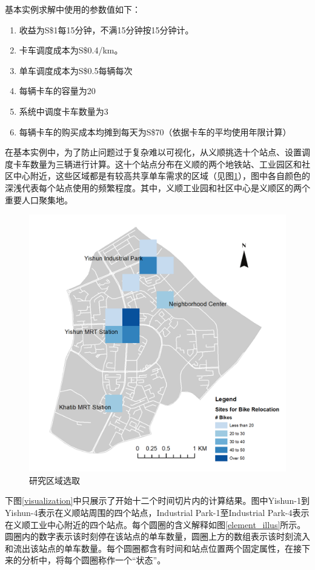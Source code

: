 \documentclass[]{tongjithesis}
\numberwithin{equation}{chapter}
\begin{document}
基本实例求解中使用的参数值如下：
\begin{enumerate}
	\item 收益为S\$1每15分钟，不满15分钟按15分钟计。
	\item 卡车调度成本为S\$0.4/km。
	\item 单车调度成本为S\$0.5每辆每次
	\item 每辆卡车的容量为20
	\item 系统中调度卡车数量为3
	\item 每辆卡车的购买成本均摊到每天为S\$70（依据卡车的平均使用年限计算）
\end{enumerate}

在基本实例中，为了防止问题过于复杂难以可视化，从义顺挑选十个站点、设置调度卡车数量为三辆进行计算。这十个站点分布在义顺的两个地铁站、工业园区和社区中心附近，这些区域都是有较高共享单车需求的区域（见图\ref{selected10}），图中各自颜色的深浅代表每个站点使用的频繁程度。其中，义顺工业园和社区中心是义顺区的两个重要人口聚集地。

\begin{figure}[H]
    \centering
    \includegraphics[width=0.5 \textwidth]{figures_main/selected_nodes10.png}
    \caption{研究区域选取}
    \label{selected10}
\end{figure}

下图\ref{visualization}中只展示了开始十二个时间切片内的计算结果。图中Yishun-1到Yishun-4表示在义顺站周围的四个站点，Industrial Park-1至Industrial Park-4表示在义顺工业中心附近的四个站点。每个圆圈的含义解释如图\ref{element_illus}所示。圆圈内的数字表示该时刻停在该站点的单车数量，圆圈上方的数组表示该时刻流入和流出该站点的单车数量。每个圆圈都含有时间和站点位置两个固定属性，在接下来的分析中，将每个圆圈称作一个“状态”。
\end{document}
